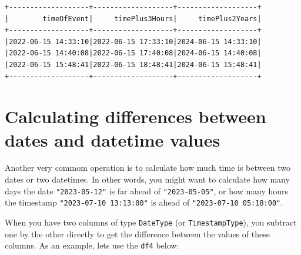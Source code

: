 \documentclass[
  11pt,
  letterpaper,
  DIV=11,
  numbers=noendperiod]{scrreprt}
\begin{document}
\begin{verbatim}
+-------------------+-------------------+-------------------+
|        timeOfEvent|     timePlus3Hours|     timePlus2Years|
+-------------------+-------------------+-------------------+
|2022-06-15 14:33:10|2022-06-15 17:33:10|2024-06-15 14:33:10|
|2022-06-15 14:40:08|2022-06-15 17:40:08|2024-06-15 14:40:08|
|2022-06-15 15:48:41|2022-06-15 18:48:41|2024-06-15 15:48:41|
+-------------------+-------------------+-------------------+
\end{verbatim}

\hypertarget{calculating-differences-between-dates-and-datetime-values}{%
\section{Calculating differences between dates and datetime
values}\label{calculating-differences-between-dates-and-datetime-values}}

Another very commom operation is to calculate how much time is between
two dates or two datetimes. In other words, you might want to calculate
how many days the date \texttt{"2023-05-12"} is far ahead of
\texttt{"2023-05-05"}, or how many hours the timestamp
\texttt{"2023-07-10\ 13:13:00"} is ahead of
\texttt{"2023-07-10\ 05:18:00"}.

When you have two columns of type \texttt{DateType} (or
\texttt{TimestampType}), you subtract one by the other directly to get
the difference between the values of these columns. As an example, lets
use the \texttt{df4} below:
\end{document}
